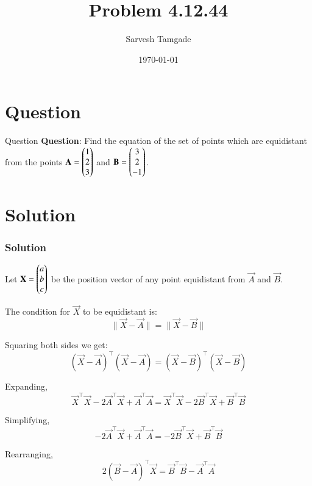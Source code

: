 \documentclass{beamer}
\title{Problem 4.12.44}
\author{Sarvesh Tamgade}
\date{\today}
\numberwithin{equation}{section}
\begin{document}
\begin{frame}
\titlepage
\end{frame}

\section{Question}
\begin{frame}{Question}
\textbf{Question}:
Find the equation of the set of points which are equidistant from the points \(\mathbf{A} = \begin{pmatrix}1 \\ 2 \\ 3\end{pmatrix}\) and \(\mathbf{B} = \begin{pmatrix}3 \\ 2 \\ -1\end{pmatrix}\).

\end{frame}

\section{Solution}
\begin{frame}[fragile]
    \frametitle{Solution}
Let \(\mathbf{X} = \begin{pmatrix}a \\ b \\ c\end{pmatrix}\) be the position vector of any point equidistant from \(\vec{A}\) and \(\vec{B}\).

The condition for \(\vec{X}\) to be equidistant is:
\begin{equation}
\|\vec{X} - \vec{A}\| = \|\vec{X} - \vec{B}\|
\end{equation}

Squaring both sides we get:
\begin{equation}
(\vec{X} - \vec{A})^\top (\vec{X} - \vec{A}) = (\vec{X} - \vec{B})^\top (\vec{X} - \vec{B})
\end{equation}

Expanding,
\begin{equation}
\vec{X}^\top \vec{X} - 2 \vec{A}^\top \vec{X} + \vec{A}^\top \vec{A} = \vec{X}^\top \vec{X} - 2 \vec{B}^\top \vec{X} + \vec{B}^\top \vec{B}
\end{equation}

Simplifying,
\begin{equation}
-2 \vec{A}^\top \vec{X} + \vec{A}^\top \vec{A} = -2 \vec{B}^\top \vec{X} + \vec{B}^\top \vec{B}
\end{equation}

Rearranging,
\begin{equation}
2(\vec{B} - \vec{A})^\top \vec{X} = \vec{B}^\top \vec{B} - \vec{A}^\top \vec{A}
\end{equation}

\end{frame}
\end{document}
